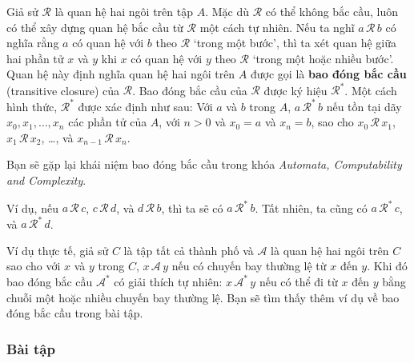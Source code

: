 Giả sử $\mathcal{R}$ là quan hệ hai ngôi trên tập $A$. Mặc dù $\mathcal{R}$ có thể không bắc cầu, luôn có thể xây dựng quan hệ bắc cầu từ $\mathcal{R}$ một cách tự nhiên. Nếu ta nghĩ $a\,\mathcal{R}\,b$ có nghĩa rằng $a$ có quan hệ với $b$ theo $\mathcal{R}$ `trong một bước', thì ta xét quan hệ giữa hai phần tử $x$ và $y$ khi $x$ có quan hệ với $y$ theo $\mathcal{R}$ `trong một hoặc nhiều bước'. Quan hệ này định nghĩa quan hệ hai ngôi trên $A$ được gọi là \textbf{bao đóng bắc cầu} (transitive closure) của $\mathcal{R}$. Bao đóng bắc cầu của $\mathcal{R}$ được ký hiệu $\mathcal{R}^*$. Một cách hình thức, $\mathcal{R}^*$ được xác định như sau: Với $a$ và $b$ trong $A$, $a\,\mathcal{R}^*\,b$ nếu tồn tại dãy $x_0, x_1, \ldots, x_n$ các phần tử của $A$, với $n > 0$ và $x_0 = a$ và $x_n = b$, sao cho $x_0\,\mathcal{R}\,x_1$, $x_1\,\mathcal{R}\,x_2$, \ldots, và $x_{n-1}\,\mathcal{R}\,x_n$.

\begin{infobox}
Bạn sẽ gặp lại khái niệm bao đóng bắc cầu trong khóa \emph{Automata, Computability and Complexity}.
\end{infobox}

Ví dụ, nếu $a\,\mathcal{R}\,c$, $c\,\mathcal{R}\,d$, và $d\,\mathcal{R}\,b$, thì ta sẽ có $a\,\mathcal{R}^*\,b$. Tất nhiên, ta cũng có $a\,\mathcal{R}^*\,c$, và $a\,\mathcal{R}^*\,d$.

\begin{example}
Ví dụ thực tế, giả sử $C$ là tập tất cả thành phố và $\mathcal{A}$ là quan hệ hai ngôi trên $C$ sao cho với $x$ và $y$ trong $C$, $x\,\mathcal{A}\,y$ nếu có chuyến bay thường lệ từ $x$ đến $y$. Khi đó bao đóng bắc cầu $\mathcal{A}^*$ có giải thích tự nhiên: $x\,\mathcal{A}^*\,y$ nếu có thể đi từ $x$ đến $y$ bằng chuỗi một hoặc nhiều chuyến bay thường lệ. Bạn sẽ tìm thấy thêm ví dụ về bao đóng bắc cầu trong bài tập.
\end{example}

\subsubsection*{Bài tập}

